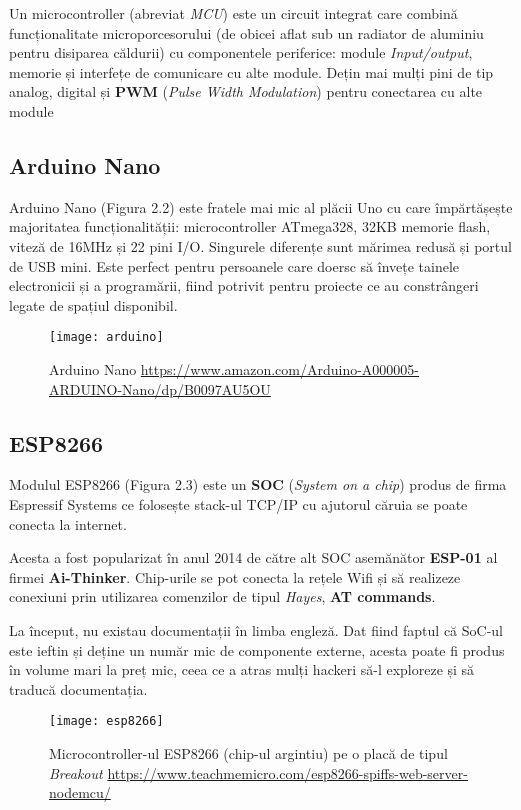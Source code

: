 Un microcontroller (abreviat \emph{MCU}) este un circuit integrat care combină funcționalitate microporcesorului (de obicei aflat sub un radiator de aluminiu pentru disiparea căldurii) cu componentele periferice: module \emph{Input/output}, memorie și interfețe de comunicare cu alte module. Dețin mai mulți pini de tip analog, digital și \textbf{PWM} (\emph{Pulse Width Modulation}) pentru conectarea cu alte module

\subsection{Arduino Nano}

Arduino Nano (Figura 2.2) este fratele mai mic al plăcii Uno cu care împărtășește majoritatea funcționalității: microcontroller ATmega328, 32KB memorie flash, viteză de 16MHz și 22 pini I/O.  Singurele diferențe sunt mărimea redusă și portul de USB mini. Este perfect pentru persoanele care doersc să învețe tainele electronicii și a programării, fiind potrivit pentru proiecte ce au constrângeri legate de spațiul disponibil.

\begin{figure}[h]
	\centering
	\texttt{[image: arduino]}
	\caption{Arduino Nano \newline\url{https://www.amazon.com/Arduino-A000005-ARDUINO-Nano/dp/B0097AU5OU}}
	\label{fig:arduino}
\end{figure}

\subsection{ESP8266}

Modulul ESP8266 (Figura 2.3) este un \textbf{SOC} (\emph{System on a chip}) produs de firma Espressif Systems ce folosește stack-ul TCP/IP cu ajutorul căruia se poate conecta la internet.

Acesta a fost popularizat în anul 2014 de către alt SOC asemănător \textbf{ESP-01} al firmei \textbf{Ai-Thinker}. Chip-urile se pot conecta la rețele Wifi și să realizeze conexiuni prin utilizarea comenzilor de tipul \emph{Hayes}, \textbf{AT commands}.

La început, nu existau documentații în limba engleză. Dat fiind faptul că SoC-ul este ieftin și deține un număr mic de componente externe, acesta poate fi produs în volume mari la preț mic, ceea ce a atras mulți hackeri să-l exploreze și să traducă documentația. 

\begin{figure}[h]
	\centering
	\texttt{[image: esp8266]}
	\caption{Microcontroller-ul ESP8266 (chip-ul argintiu) pe o placă de tipul \emph{Breakout} \newline\url{https://www.teachmemicro.com/esp8266-spiffs-web-server-nodemcu/}}
	\label{fig:esp8266}
\end{figure}

